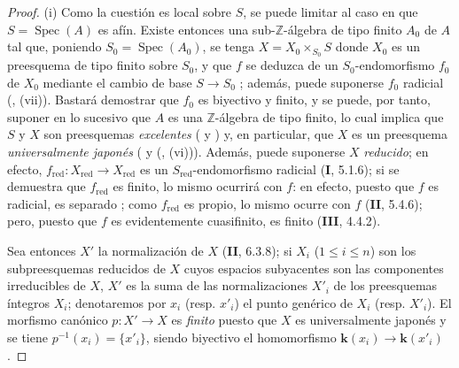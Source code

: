 \begin{proof}
\textup{(i)} Como la cuestión es local sobre $S$, se puede limitar al caso
en que $S=\operatorname{Spec}(A)$ es afín. Existe entonces una
sub-$\mathbb Z$-álgebra de tipo finito $A_0$ de $A$ tal que, poniendo
$S_0=\operatorname{Spec}(A_0)$, se tenga
$X=X_0\times_{S_0}S$ donde $X_0$ es un preesquema de tipo finito sobre $S_0$,
y que $f$ se deduzca de un $S_0$-endomorfismo $f_0$ de $X_0$ mediante el
cambio de base $S\to S_0$
{}; además, puede suponerse
$f_0$ radicial ({}, (vii)).
Bastará demostrar que $f_0$ es biyectivo y finito, y se puede, por tanto,
suponer en lo sucesivo que $A$ es una $\mathbb Z$-álgebra de tipo finito, lo
cual implica que $S$ y $X$ son preesquemas \emph{excelentes}
({} y
{}) y, en particular, que $X$
es un preesquema \emph{universalmente japonés}
({} y
({}, (vi))). Además, puede
suponerse $X$ \emph{reducido}; en efecto,
$f_{\mathrm{red}}:X_{\mathrm{red}}\to X_{\mathrm{red}}$ es un
$S_{\mathrm{red}}$-endomorfismo radicial (\textbf I, 5.1.6); si se demuestra que
$f_{\mathrm{red}}$ es finito, lo mismo ocurrirá con $f$: en efecto,
puesto que $f$ es radicial, es separado
{}; como
$f_{\mathrm{red}}$ es propio, lo mismo ocurre con $f$ (\textbf{II}, 5.4.6);
pero, puesto que $f$ es evidentemente cuasifinito, es finito (\textbf{III}, 4.4.2).

Sea entonces $X'$ la normalización de $X$ (\textbf{II}, 6.3.8); si $X_i$
($1\leq i\leq n$) son los subpreesquemas reducidos de $X$ cuyos
espacios subyacentes son las componentes irreducibles de $X$, $X'$ es
la suma de las normalizaciones $X'_i$ de los preesquemas íntegros $X_i$;
denotaremos por $x_i$ (resp. $x'_i$) el punto genérico de $X_i$
(resp. $X'_i$). El morfismo canónico $p:X'\to X$ es \emph{finito} puesto que
$X$ es universalmente japonés y se tiene
$p^{-1}(x_i)=\{x'_i\}$, siendo biyectivo el homomorfismo
$\boldsymbol{k}(x_i)\to\boldsymbol{k}(x'_i)$.


\end{proof}
